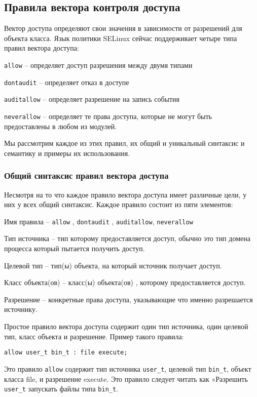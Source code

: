 \documentclass{./../class/UIR}
\begin{document}
\subsection{Правила вектора контроля доступа}

    Вектор доступа определяют свои значения в зависимости от разрешений для
    объекта класса. Язык политики SELinux сейчас поддерживает четыре типа правил
    вектора доступа:
    \begin{description}
      \item \verb"allow" – определяет доступ разрешения между двумя типами
      \item \verb"dontaudit" – определяет отказ в доступе
      \item \verb"auditallow" – определяет разрешение на запись события
      \item \verb"neverallow"  – определяет те права доступа, которые не могут
      быть предоставлены в любом из модулей.
    \end{description}
    Мы рассмотрим каждое из этих правил, их общий и уникальный синтаксис и
    семантику и примеры их использования.

\subsubsection{Общий синтаксис правил вектора доступа}
    Несмотря на то что каждое правило вектора доступа имеет различные цели, у них у
    всех общий синтаксис. Каждое правило состоит из пяти элементов:

    \begin{description}
      \item Имя правила – \verb"allow" , \verb"dontaudit" , \verb"auditallow",
      \verb"neverallow"
      \item Тип источника – тип которому предоставляется доступ, обычно это тип
      домена процесса который пытается получить доступ.
      \item Целевой тип – тип(ы) объекта, на который источник получает доступ.
      \item Класс объекта(ов) – класс(ы) объекта(ов) , которому предоставляется
      доступ.
      \item Разрешение – конкретные права доступа, указывающие что именно
      разрешается источнику.
    \end{description}

    Простое правило вектора доступа содержит один тип источника, один целевой тип,
    класс объекта и разрешение. Пример такого правила:
\begin{verbatim}
allow user_t bin_t : file execute;
\end{verbatim}
    Это правило \verb"allow"  содержит тип источника \verb"user_t", целевой тип
    \verb"bin_t", объект класса file, и разрешение execute. Это правило следует
    читать как «Разрешить \verb"user_t" запускать файлы типа \verb"bin_t".
\end{document}
